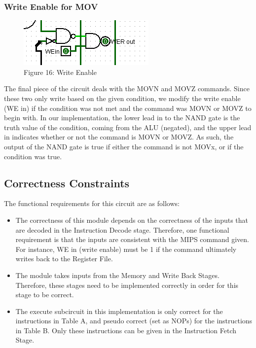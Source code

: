 \documentclass{article}
\begin{document}
\subsubsection{Write Enable for MOV}
\begin{figure}
\vspace{-.3cm}
\begin{center}
\includegraphics{MOV.png} \\
Figure 16: Write Enable 
\end{center}
\vspace{-.4cm}
\end{figure}
The final piece of the circuit deals with the MOVN and MOVZ commands. Since these two only write based on the given condition, we modify the write enable (WE in) if the condition was not met and the command was MOVN or MOVZ to begin with. In our implementation, the lower lead in to the NAND gate is the truth value of the condition, coming from the ALU (negated), and the upper lead in indicates whether or not the command is MOVN or MOVZ. As such, the output of the NAND gate is true if either the command is not MOVx, or if the condition was true. 

\subsection{Correctness Constraints}
The functional requirements for this circuit are as follows:
\begin{itemize}
\item The correctness of this module depends on the correctness of the inputs that are decoded in the Instruction Decode stage. Therefore, one functional requirement is that the inputs are consistent with the MIPS command given. For instance, WE in (write enable) must be 1 if the command ultimately writes back to the Register File. 
\item The module takes inputs from the Memory and Write Back Stages. Therefore, these stages need to be implemented correctly in order for this stage to be correct.
\item The execute subcircuit in this implementation is only correct for the instructions in Table A, and pseudo correct (set as NOPs) for the instructions in Table B. Only these instructions can be given in the Instruction Fetch Stage.

\end{itemize}
\end{document}
